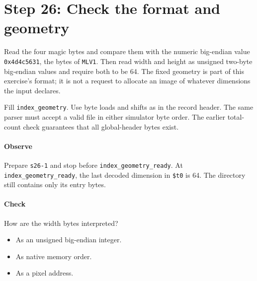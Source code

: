 \section{Step 26: Check the format and geometry}
Read the four magic bytes and compare them with the numeric big-endian
value \texttt{0x4d4c5631}, the bytes of \texttt{MLV1}. Then read width and
height as unsigned two-byte big-endian values and require both to be 64. The
fixed geometry is part of this exercise's format; it is not a request to allocate
an image of whatever dimensions the input declares.

Fill \texttt{index\_geometry}. Use byte loads and shifts as in the record
header. The same parser must accept a valid file in either simulator byte order.
The earlier total-count check guarantees that all global-header bytes exist.

\paragraph{Observe} Prepare \texttt{s26-1} and stop before
\texttt{index\_geometry\_ready}. At \texttt{index\_geometry\_ready}, the last decoded
dimension in \texttt{\$t0} is 64. The directory still contains only its entry
bytes.

\paragraph{Check} How are the width bytes interpreted?
\begin{itemize}
\item[A.] As an unsigned big-endian integer.
\item[B.] As native memory order.
\item[C.] As a pixel address.
\end{itemize}
